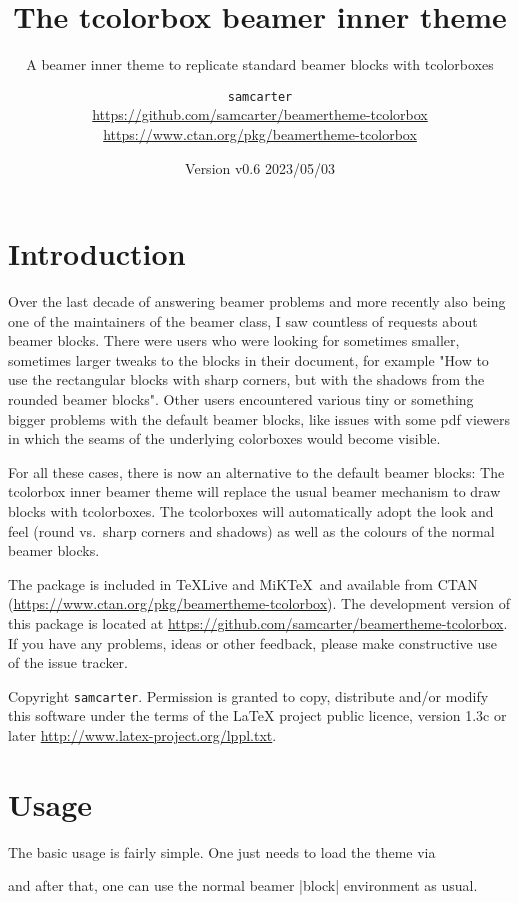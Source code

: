 \documentclass{scrartcl}
\title{The tcolorbox beamer inner theme}
\subtitle{A beamer inner theme to replicate standard beamer blocks with tcolorboxes}
\author{%
  \texorpdfstring{
    \texttt{samcarter}\\
    \url{https://github.com/samcarter/beamertheme-tcolorbox}\\
    \url{https://www.ctan.org/pkg/beamertheme-tcolorbox}
  }{samcarter}}
\date{Version v0.6 \textendash{} 2023/05/03}
\begin{document}
\maketitle

\section{Introduction}
\label{intro}

Over the last decade of answering beamer problems and more recently also being one of the maintainers of the beamer class, I saw countless of requests about beamer blocks. There were users who were looking for sometimes smaller, sometimes larger tweaks to the blocks in their document, for example "How to use the rectangular blocks with sharp corners, but with the shadows from the rounded beamer blocks". Other users encountered various tiny or something bigger problems with the default beamer blocks, like issues with some pdf viewers in which the seams of the underlying colorboxes would become visible.

For all these cases, there is now an alternative to the default beamer blocks: The tcolorbox inner beamer theme will replace the usual beamer mechanism to draw blocks with tcolorboxes. The tcolorboxes will automatically adopt the look and feel (round vs.\ sharp corners and shadows) as well as the colours of the normal beamer blocks.

The package is included in \TeX{}Live and MiK\TeX\ and available from \textsc{CTAN} (\url{https://www.ctan.org/pkg/beamertheme-tcolorbox}).
The development version of this package is located at \url{https://github.com/samcarter/beamertheme-tcolorbox}. If you have any problems, ideas or other feedback, please make constructive use of the issue tracker.

Copyright  \texttt{samcarter}. Permission is granted to copy, distribute and\slash or modify this software under the terms of the LaTeX project public licence, version 1.3c or later \url{http://www.latex-project.org/lppl.txt}.

\section{Usage}

The basic usage is fairly simple. One just needs to load the theme via
\begin{tcolorbox}[lower separated=false,title={Usage}]
\begin{samcode}
\end{samcode}
\end{tcolorbox}
and after that, one can use the normal beamer \saminline|block| environment as usual.
\end{document}
